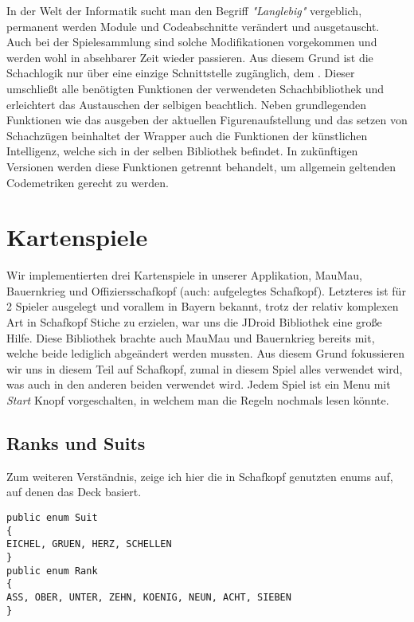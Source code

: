 In der Welt der Informatik sucht man den Begriff \emph{"Langlebig"} vergeblich,
permanent werden Module und Codeabschnitte verändert und ausgetauscht. Auch bei
der Spielesammlung sind solche Modifikationen vorgekommen und werden wohl in
absehbarer Zeit wieder passieren. Aus diesem Grund ist die Schachlogik nur über
eine einzige Schnittstelle zugänglich, dem . Dieser
umschließt alle benötigten Funktionen der verwendeten Schachbibliothek und
erleichtert das Austauschen der selbigen beachtlich. Neben grundlegenden
Funktionen wie das ausgeben der aktuellen Figurenaufstellung und das setzen von
Schachzügen beinhaltet der Wrapper auch die Funktionen der künstlichen
Intelligenz, welche sich in der selben Bibliothek befindet. In zukünftigen
Versionen werden diese Funktionen getrennt behandelt, um allgemein geltenden
Codemetriken gerecht zu werden. 

\section{Kartenspiele}
\sectionauthor{\philipp}
Wir implementierten drei Kartenspiele in unserer Applikation, MauMau, Bauernkrieg und Offiziersschafkopf (auch: aufgelegtes Schafkopf). Letzteres ist für 2 Spieler ausgelegt und vorallem in Bayern bekannt, trotz der relativ komplexen Art in Schafkopf Stiche zu erzielen, war uns die JDroid Bibliothek eine große Hilfe. Diese Bibliothek brachte auch MauMau und Bauernkrieg bereits mit, welche beide lediglich abgeändert werden mussten.
Aus diesem Grund fokussieren wir uns in diesem Teil auf Schafkopf, zumal in diesem Spiel alles verwendet wird, was auch in den anderen beiden verwendet wird.
Jedem Spiel ist ein Menu mit \emph{Start} Knopf vorgeschalten, in welchem man die Regeln nochmals lesen könnte.

\subsection{Ranks und Suits}
Zum weiteren Verständnis, zeige ich hier die in Schafkopf genutzten enums auf, auf denen das Deck basiert.

\begin{lstlisting}[caption={Enums für Kartenwertigkeiten},captionpos=b]
public enum Suit
{
EICHEL, GRUEN, HERZ, SCHELLEN
}
public enum Rank
{
ASS, OBER, UNTER, ZEHN, KOENIG, NEUN, ACHT, SIEBEN
}
\end{lstlisting}

